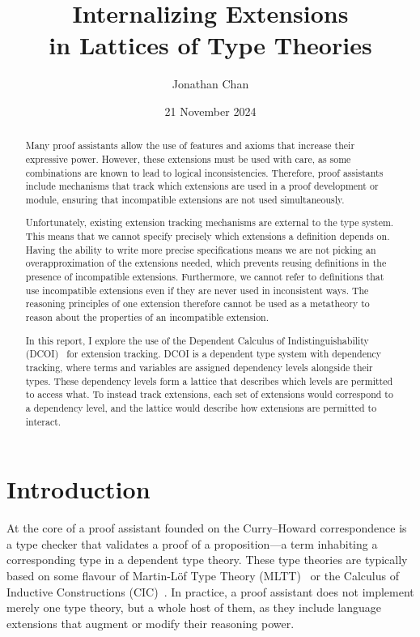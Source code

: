 \documentclass{article}
\title{\textbf{Internalizing Extensions \\ in Lattices of Type Theories}}
\author{Jonathan Chan}
\date{21 November 2024}
\begin{document}
\maketitle

\begin{abstract}
  Many proof assistants allow the use of features and axioms
  that increase their expressive power.
  However, these extensions must be used with care,
  as some combinations are known to lead to logical inconsistencies.
  Therefore, proof assistants include mechanisms that track
  which extensions are used in a proof development or module,
  ensuring that incompatible extensions are not used simultaneously.

  Unfortunately, existing extension tracking mechanisms are external to the type system.
  This means that we cannot specify precisely which extensions a definition depends on.
  Having the ability to write more precise specifications
  means we are not picking an overapproximation of the extensions needed,
  which prevents reusing definitions in the presence of incompatible extensions.
  Furthermore, we cannot refer to definitions that use incompatible extensions
  even if they are never used in inconsistent ways.
  The reasoning principles of one extension therefore cannot be used as a metatheory
  to reason about the properties of an incompatible extension.

  In this report, I explore the use of the Dependent Calculus of Indistinguishability
  (DCOI)~\citep{dcoi} for extension tracking.
  DCOI is a dependent type system with dependency tracking,
  where terms and variables are assigned dependency levels alongside their types.
  These dependency levels form a lattice that describes
  which levels are permitted to access what.
  To instead track extensions,
  each set of extensions would correspond to a dependency level,
  and the lattice would describe how extensions are permitted to interact.
\end{abstract}

\section{Introduction}

At the core of a proof assistant founded on the Curry--Howard correspondence
is a type checker that validates a proof of a proposition---a term inhabiting
a corresponding type in a dependent type theory.
These type theories are typically based on some flavour of
Martin-L\"of Type Theory (MLTT)~\citep{mltt}
or the Calculus of Inductive Constructions (CIC)~\citep{cic}.
In practice, a proof assistant does not implement merely one type theory,
but a whole host of them, as they include language extensions
that augment or modify their reasoning power.
\end{document}
